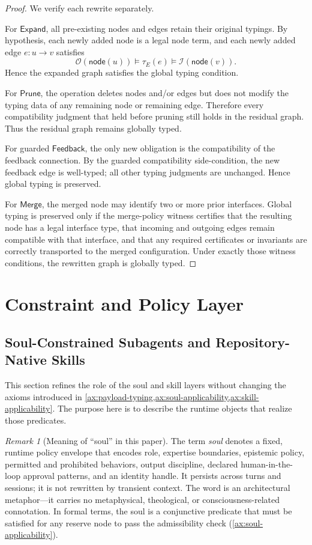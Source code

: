 \documentclass[11pt]{article}
\theoremstyle{remark}
\newtheorem{remark}{Remark}[section]
\begin{document}
\begin{proof}
We verify each rewrite separately.

For \(\mathsf{Expand}\), all pre-existing nodes and edges retain their original typings. By hypothesis, each newly added node is a legal node term, and each newly added edge \(e:u \to v\) satisfies
\[
\mathcal{O}(\mathsf{node}(u)) \models \tau_E(e) \models \mathcal{I}(\mathsf{node}(v)).
\]
Hence the expanded graph satisfies the global typing condition.

For \(\mathsf{Prune}\), the operation deletes nodes and/or edges but does not modify the typing data of any remaining node or remaining edge. Therefore every compatibility judgment that held before pruning still holds in the residual graph. Thus the residual graph remains globally typed.

For guarded \(\mathsf{Feedback}\), the only new obligation is the compatibility of the feedback connection. By the guarded compatibility side-condition, the new feedback edge is well-typed; all other typing judgments are unchanged. Hence global typing is preserved.

For \(\mathsf{Merge}\), the merged node may identify two or more prior interfaces. Global typing is preserved only if the merge-policy witness certifies that the resulting node has a legal interface type, that incoming and outgoing edges remain compatible with that interface, and that any required certificates or invariants are correctly transported to the merged configuration. Under exactly those witness conditions, the rewritten graph is globally typed.
\end{proof}

\section{Constraint and Policy Layer}

\subsection[Soul-Constrained Subagents and Skills]{Soul-Constrained Subagents and Repository-Native Skills}\label{sec:soul-skills}

This section refines the role of the soul and skill layers without changing the axioms introduced in \cref{ax:payload-typing,ax:soul-applicability,ax:skill-applicability}. The purpose here is to describe the runtime objects that realize those predicates.

\begin{remark}[Meaning of ``soul'' in this paper]\label{rem:soul-meaning}
The term \emph{soul} denotes a fixed, runtime policy envelope that encodes role, expertise boundaries, epistemic policy, permitted and prohibited behaviors, output discipline, declared human-in-the-loop approval patterns, and an identity handle.
It persists across turns and sessions; it is not rewritten by transient context.
The word is an architectural metaphor---it carries no metaphysical, theological, or consciousness-related connotation.
In formal terms, the soul is a conjunctive predicate that must be satisfied for any reserve node to pass the admissibility check (\cref{ax:soul-applicability}).
\end{remark}
\end{document}
